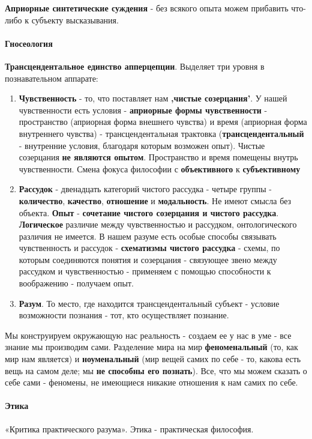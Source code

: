 \documentclass{article}
\begin{document}
\begin{flushleft}
\textbf{Априорные синтетические суждения} - без всякого опыта можем прибавить что-либо к субъекту высказывания.

\paragraph{Гносеология} \textbf{Трансцендентальное единство апперцепции}. Выделяет три уровня в познавательном аппарате:

\begin{enumerate}
    \item \textbf{Чувственность} - то, что поставляет нам \textbf{,чистые созерцания'}. У нашей чувственности есть условия - \textbf{априорные формы чувственности} - пространство (априорная форма внешнего чувства) и время (априорная форма внутреннего чувства) - трансцендентальная трактовка (\textbf{трансцендентальный} - внутренние условия, благодаря которым возможен опыт). Чистые созерцания \textbf{не являются опытом}. Пространство и время помещены внутрь чувственности. Смена фокуса философии с \textbf{объективного} к \textbf{субъективному}
    \item \textbf{Рассудок} - двенадцать категорий чистого рассудка - четыре группы - \textbf{количество}, \textbf{качество}, \textbf{отношение} и \textbf{модальность}. Не имеют смысла без объекта. \textbf{Опыт} - \textbf{сочетание чистого созерцания и чистого рассудка}. \textbf{Логическое} различие между чувственностью и рассудком, онтологического различия не имеется. В нашем разуме есть особые способы связывать чувственность и рассудок - \textbf{схематизмы чистого рассудка} - схемы, по которым соединяются понятия и созерцания - связующее звено между рассудком и чувственностью - применяем с помощью способности к воображению - получаем опыт.
    \item \textbf{Разум}. То место, где находится трансцендентальный субъект - условие возможности познания - тот, кто осуществляет познание.
\end{enumerate}

Мы конструируем окружающую нас реальность - создаем ее у нас в уме - все знание мы производим сами. Разделение мира на мир \textbf{феноменальный} (то, как мир нам является) и \textbf{ноуменальный} (мир вещей самих по себе - то, какова есть вещь на самом деле; мы \textbf{не способны его познать}). Все, что мы можем сказать о себе сами - феномены, не имеющиеся никакие отношения к нам самих по себе.

\paragraph{Этика} «Критика практического разума». Этика - практическая философия.


\end{flushleft}
\end{document}

